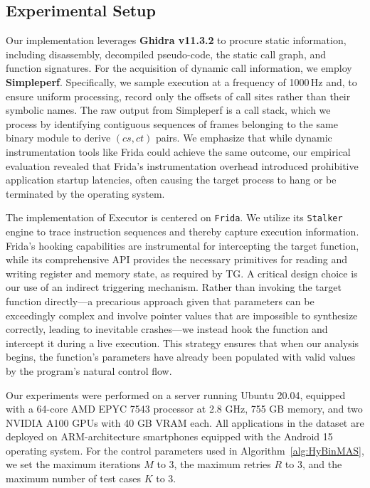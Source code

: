 \documentclass[acmsmall,screen,review,anonymous]{acmart} %
\begin{document}
\subsection{Experimental Setup}
Our implementation leverages \textbf{Ghidra v11.3.2} to procure static information, including disassembly, decompiled pseudo-code, the static call graph, and function signatures. For the acquisition of dynamic call information, we employ \textbf{Simpleperf}. Specifically, we sample execution at a frequency of 1000\,Hz and, to ensure uniform processing, record only the offsets of call sites rather than their symbolic names. The raw output from Simpleperf is a call stack, which we process by identifying contiguous sequences of frames belonging to the same binary module to derive \((cs, ct)\) pairs. We emphasize that while dynamic instrumentation tools like Frida could achieve the same outcome, our empirical evaluation revealed that Frida's instrumentation overhead introduced prohibitive application startup latencies, often causing the target process to hang or be terminated by the operating system.

The implementation of Executor is centered on \texttt{Frida}. We utilize its \texttt{Stalker} engine to trace instruction sequences and thereby capture execution information. Frida's hooking capabilities are instrumental for intercepting the target function, while its comprehensive API provides the necessary primitives for reading and writing register and memory state, as required by TG. A critical design choice is our use of an indirect triggering mechanism. Rather than invoking the target function directly---a precarious approach given that parameters can be exceedingly complex and involve pointer values that are impossible to synthesize correctly, leading to inevitable crashes---we instead hook the function and intercept it during a live execution. This strategy ensures that when our analysis begins, the function's parameters have already been populated with valid values by the program's natural control flow.

Our experiments were performed on a server running Ubuntu 20.04, equipped with a 64-core AMD EPYC 7543 processor at 2.8 GHz, 755 GB memory, and two NVIDIA A100 GPUs with 40 GB VRAM each. All applications in the dataset are deployed on ARM-architecture smartphones equipped with the Android 15 operating system. For the control parameters used in Algorithm~\ref{alg:HyBinMAS}, we set the maximum iterations $M$ to 3, the maximum retries $R$ to 3, and the maximum number of test cases $K$ to 3.
\end{document}
